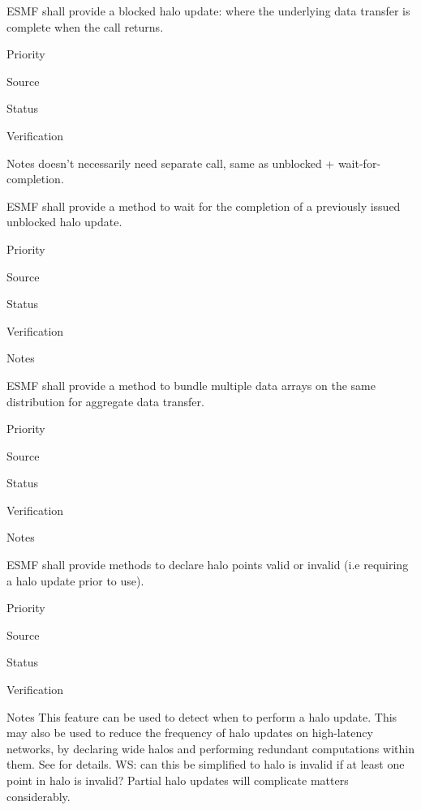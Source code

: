 
ESMF shall provide a blocked halo update: where the underlying
data transfer is complete when the call returns.

\begin{reqlist}
\item[Priority]
\item[Source]
\item[Status]
\item[Verification]
\item[Notes] doesn't necessarily need separate call, same as unblocked
  + wait-for-completion.
\end{reqlist}


ESMF shall provide a method to wait for the completion of a previously
issued unblocked halo update.

\begin{reqlist}
\item[Priority]
\item[Source]
\item[Status]
\item[Verification]
\item[Notes]
\end{reqlist}


ESMF shall provide a method to bundle multiple data arrays on the same
distribution for aggregate data transfer.

\begin{reqlist}
\item[Priority]
\item[Source]
\item[Status]
\item[Verification]
\item[Notes]
\end{reqlist}


ESMF shall provide methods to declare halo points valid or invalid
(i.e requiring a halo update prior to use).

\begin{reqlist}
\item[Priority]
\item[Source]
\item[Status]
\item[Verification]
\item[Notes] This feature can be used to detect when to perform a halo
  update. This may also be used to reduce the frequency of halo
  updates on high-latency networks, by declaring wide halos and
  performing redundant computations within them. See \cite{ref:b2001}
  for details.  WS:  can this be simplified to halo is invalid
  if at least one point in halo is invalid?  Partial halo updates
  will complicate matters considerably.
\end{reqlist}

